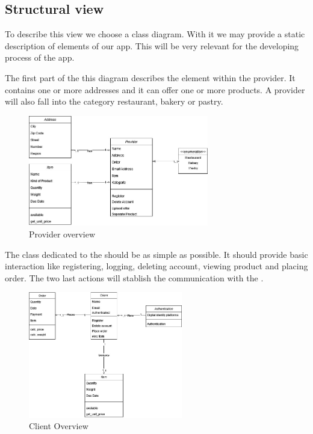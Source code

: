 \subsection{Structural view}
To describe this view we choose a \gls{class diagram}. With it we may provide a static description of elements
of our app. This will be very relevant for the developing process of the \gls{app}.

The first part of the this diagram describes the element within the \gls{provider}. It contains one or more addresses and it 
can offer one or more products. A provider will also fall into the category restaurant, bakery or pastry.

\begin{figure}[H]
    \centering
    \includegraphics[width=0.7\textwidth]{assets/Provider_Addr_Item.jpg}
    \caption{Provider overview}
    \label{fig:Provider_addr_item}
\end{figure}
 
The class dedicated to the  should be as simple as possible. It should provide basic interaction like
registering, logging, deleting account, viewing product and placing order. The two last actions will stablish the communication 
with the .

\begin{figure}[H]
    \centering
    \includegraphics[width=0.6\textwidth]{assets/client_CD.jpg}
    \caption{Client Overview}
    \label{fig:client_CD}
\end{figure}

